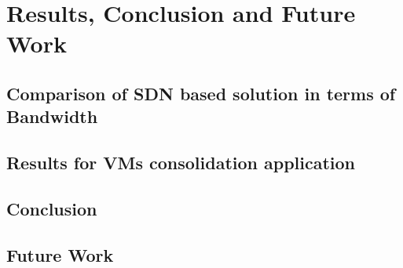 \chapter{Results, Conclusion and Future Work}


\section{Comparison of SDN based solution in terms of Bandwidth}


\section{Results for VMs consolidation application}


\section{Conclusion}

\section{Future Work}
